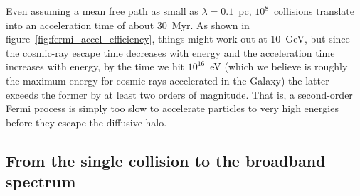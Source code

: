 Even assuming a mean free path as small as $\lambda = 0.1$~pc, $10^8$~collisions
translate into an acceleration time of about 30~Myr. As shown in
figure~\ref{fig:fermi_accel_efficiency}, things might work out at 10~GeV, but
since the cosmic-ray escape time decreases with energy and the acceleration time
increases with energy, by the time we hit $10^{16}$~eV (which we believe is roughly
the maximum energy for cosmic rays accelerated in the Galaxy) the latter exceeds
the former by at least two orders of magnitude. That is, a second-order Fermi process
is simply too slow to accelerate particles to very high energies before they escape
the diffusive halo.


\subsection{From the single collision to the broadband spectrum}

